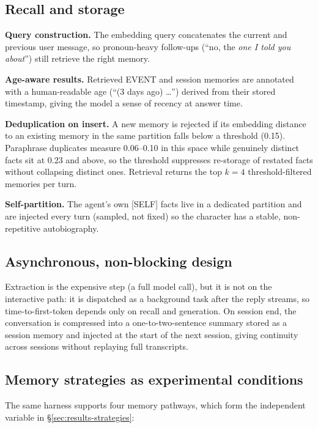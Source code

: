 \subsection{Recall and storage}
\label{sec:method-recall}

\textbf{Query construction.} The embedding query concatenates the current and
previous user message, so pronoun-heavy follow-ups (``no, the \emph{one I told you
about}'') still retrieve the right memory.

\textbf{Age-aware results.} Retrieved EVENT and session memories are annotated with a
human-readable age (``(3 days ago) \ldots'') derived from their stored timestamp, giving
the model a sense of recency at answer time.

\textbf{Deduplication on insert.} A new memory is rejected if its embedding distance
to an existing memory in the same partition falls below a threshold (0.15).
Paraphrase duplicates measure 0.06--0.10 in this space while genuinely distinct
facts sit at 0.23 and above, so the threshold suppresses re-storage of restated
facts without collapsing distinct ones. Retrieval returns the top $k = 4$
threshold-filtered memories per turn.

\textbf{Self-partition.} The agent's own [SELF] facts live in a dedicated partition
and are injected every turn (sampled, not fixed) so the character has a stable,
non-repetitive autobiography.

\subsection{Asynchronous, non-blocking design}
\label{sec:method-async}

Extraction is the expensive step (a full model call), but it is not on the
interactive path: it is dispatched as a background task after the reply streams,
so time-to-first-token depends only on recall and generation. On session end,
the conversation is compressed into a one-to-two-sentence summary stored as a
session memory and injected at the start of the next session, giving continuity
across sessions without replaying full transcripts.

\subsection{Memory strategies as experimental conditions}
\label{sec:method-strategies}

The same harness supports four memory pathways, which form the independent
variable in \S\ref{sec:results-strategies}:


